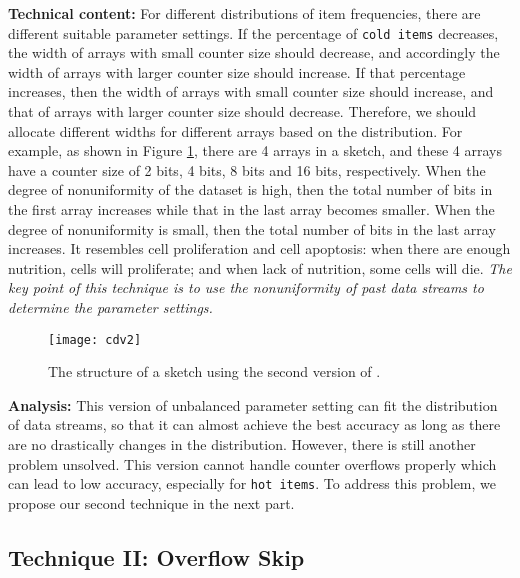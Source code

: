 \noindent\textbf{Technical content: }For different distributions of item frequencies, there are different suitable parameter settings. If the percentage of \texttt{cold items} decreases, the width of arrays with small counter size should decrease, and accordingly the width of arrays with larger counter size should increase. If that percentage increases, then the width of arrays with small counter size should increase, and that of arrays with larger counter size should decrease.
Therefore, we should allocate different widths for different arrays based on the distribution.
For example, as shown in Figure \ref{draw:version2}, there are 4 arrays in a sketch, and these 4 arrays have a counter size of 2 bits, 4 bits, 8 bits and 16 bits, respectively.
When the degree of nonuniformity of the dataset is high, then the total number of bits in the first array increases while that in the last array becomes smaller.
When the degree of nonuniformity is small, then the total number of bits in the last array increases.
It resembles cell proliferation and cell apoptosis: when there are enough nutrition, cells will proliferate; and when lack of nutrition, some cells will die.
\textit{The key point of this technique is to use the nonuniformity of past data streams to determine the parameter settings.}

\begin{figure}[htbp]
	\centering
	\texttt{[image: cdv2]}
	\caption{The structure of a sketch using the second version of \fname.} 
	\label{draw:version2}
\end{figure}


\noindent\textbf{Analysis: }This version of unbalanced parameter setting can fit the distribution of data streams, so that it can almost achieve the best accuracy as long as there are no drastically changes in the distribution.
However, there is still another problem unsolved.
This version cannot handle counter overflows properly which can lead to low accuracy, especially for \texttt{hot items}.
To address this problem, we propose our second technique in the next part.

\presub
\subsection{Technique II: Overflow Skip} \postsub

